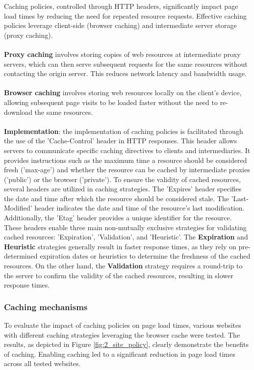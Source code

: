 Caching policies, controlled through HTTP headers, significantly impact page load times by reducing the need for repeated 
resource requests. Effective caching policies leverage client-side (browser caching) and intermediate server storage 
(proxy caching). \\
\\
\textbf{Proxy caching} involves storing copies of web resources at intermediate proxy servers, which can then serve subsequent requests 
for the same resources without contacting the origin server. This reduces network latency and bandwidth usage.\\
\\
\textbf{Browser caching} involves storing web resources locally on the client's device, allowing subsequent page visits to be loaded 
faster without the need to re-download the same resources.\\
\\
\textbf{Implementation}: the implementation of caching policies is facilitated through the use of the 'Cache-Control' header in HTTP responses. 
This header allows servers to communicate specific caching directives to clients and intermediaries. It provides instructions such as the maximum 
time a resource should be considered fresh ('max-age') and whether the resource can be cached by intermediate proxies ('public') or the browser ('private').
To ensure the validity of cached resources, several headers are utilized in caching strategies. The 'Expires' header specifies the date and time after which 
the resource should be considered stale. The 'Last-Modified' header indicates the date and time of the resource's last modification. Additionally, 
the 'Etag' header provides a unique identifier for the resource. These headers enable three main non-mutually exclusive strategies for validating 
cached resources: 'Expiration', 'Validation', and 'Heuristic'. The \textbf{Expiration} and \textbf{Heuristic} strategies generally result in faster response times, 
as they rely on pre-determined expiration dates or heuristics to determine the freshness of the cached resources. On the other hand, 
the \textbf{Validation} strategy requires a round-trip to the server to confirm the validity of the cached resources, resulting in slower response times.

\subsubsection{Caching mechanisms}
To evaluate the impact of caching policies on page load times, various websites with different caching strategies leveraging the browser cache were tested. 
The results, as depicted in Figure \ref{fig:2_site_policy}, clearly demonstrate the benefits of caching. Enabling caching led to a significant reduction 
in page load times across all tested websites. 

